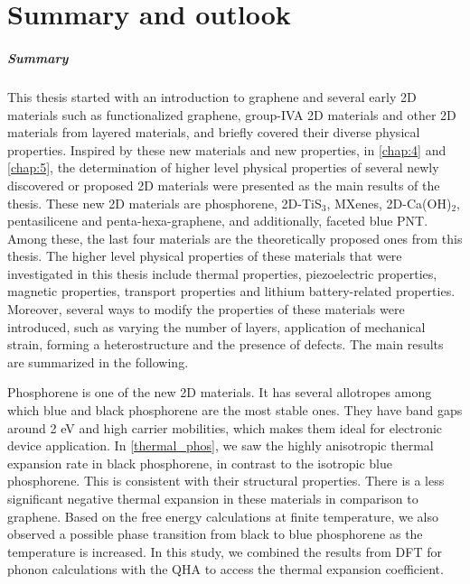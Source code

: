 
\chapter{Summary and outlook}


\paragraph{Summary} This thesis started with an introduction to graphene and several early 2D materials such as functionalized graphene, group-IVA 2D materials and other 2D materials from layered materials, and briefly covered their diverse physical properties. Inspired by these new materials and new properties, in \autoref{chap:4} and \autoref{chap:5}, the determination of higher level physical properties of several newly discovered or proposed 2D materials were presented as the main results of the thesis. These new 2D materials are phosphorene, 2D-TiS$_3$, MXenes, 2D-Ca(OH)$_2$, pentasilicene and penta-hexa-graphene, and additionally, faceted blue PNT. Among these, the last four materials are the theoretically proposed ones from this thesis. The higher level physical properties of these materials that were investigated in this thesis include thermal properties, piezoelectric properties, magnetic properties, transport properties and lithium battery-related properties. Moreover, several ways to modify the properties of these materials were introduced, such as varying the number of layers, application of mechanical strain, forming a heterostructure and the presence of defects. The main results are summarized in the following.

Phosphorene is one of the new 2D materials. It has several allotropes among which blue and black phosphorene are the most stable ones. They have band gaps around 2 eV and high carrier mobilities, which makes them ideal for electronic device application. In \autoref{thermal_phos}, we saw the highly anisotropic thermal expansion rate in black phosphorene, in contrast to the isotropic blue phosphorene. This is consistent with their structural properties. There is a less significant negative thermal expansion in these materials in comparison to graphene. Based on the free energy calculations at finite temperature, we also observed a possible phase transition from black to blue phosphorene as the temperature is increased. In this study, we combined the results from DFT for phonon calculations with the QHA to access the thermal expansion coefficient.

